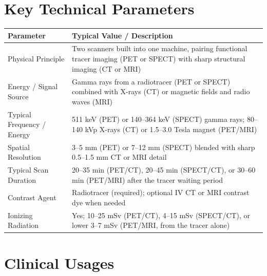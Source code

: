 \section{Key Technical Parameters}
\noindent
\begin{tabularx}{\textwidth}{@{}l X@{}}
\toprule
\textbf{Parameter} & \textbf{Typical Value / Description} \\
\midrule
Physical Principle & Two scanners built into one machine, pairing functional tracer imaging (PET or SPECT) with sharp structural imaging (CT or MRI) \\
Energy / Signal Source & Gamma rays from a radiotracer (PET or SPECT) combined with X-rays (CT) or magnetic fields and radio waves (MRI) \\
Typical Frequency / Energy & 511 keV (PET) or 140--364 keV (SPECT) gamma rays; 80--140 kVp X-rays (CT) or 1.5--3.0 Tesla magnet (PET/MRI) \\
Spatial Resolution & 3--5 mm (PET) or 7--12 mm (SPECT) blended with sharp 0.5--1.5 mm CT or MRI detail \\
Typical Scan Duration & 20--35 min (PET/CT), 20--45 min (SPECT/CT), or 30--60 min (PET/MRI) after the tracer waiting period \\
Contrast Agent & Radiotracer (required); optional IV CT or MRI contrast dye when needed \\
Ionizing Radiation & Yes; 10--25 mSv (PET/CT), 4--15 mSv (SPECT/CT), or lower 3--7 mSv (PET/MRI, from the tracer alone) \\
\bottomrule
\end{tabularx}

\section{Clinical Usages}

